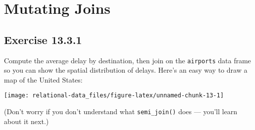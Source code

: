 \documentclass[]{book}
\newenvironment{Shaded}{\begin{snugshade}}{\end{snugshade}}
\newcommand{\KeywordTok}[1]{\textcolor[rgb]{0.13,0.29,0.53}{\textbf{#1}}}
\newcommand{\NormalTok}[1]{#1}
\newcommand{\OperatorTok}[1]{\textcolor[rgb]{0.81,0.36,0.00}{\textbf{#1}}}
\newcommand{\StringTok}[1]{\textcolor[rgb]{0.31,0.60,0.02}{#1}}
\theoremstyle{plain}
\theoremstyle{remark}
\begin{document}
\hypertarget{mutating-joins}{%
\section{Mutating Joins}\label{mutating-joins}}

\begin{Shaded}
\end{Shaded}

\hypertarget{exercise-13.3.1}{%
\subsection*{\texorpdfstring{Exercise
{13.3.1}}{Exercise 13.3.1}}\label{exercise-13.3.1}}

Compute the average delay by destination, then join on the
\texttt{airports} data frame so you can show the spatial distribution of
delays. Here's an easy way to draw a map of the United States:

\begin{Shaded}
\end{Shaded}

\begin{center}\texttt{[image: relational-data\_files/figure-latex/unnamed-chunk-13-1]} \end{center}

(Don't worry if you don't understand what \texttt{semi\_join()} does ---
you'll learn about it next.)
\end{document}
